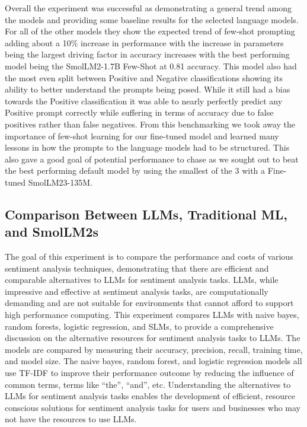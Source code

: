\documentclass[10pt,twocolumn,letterpaper]{article}
\begin{document}
Overall the experiment was successful as demonstrating a general trend among the models and providing some baseline results for the selected language models. For all of the other models they show the expected trend of few-shot prompting adding about a 10\% increase in performance with the increase in parameters being the largest driving factor in accuracy increases with the best performing model being the SmolLM2-1.7B Few-Shot at 0.81 accuracy. This model also had the most even split between Positive and Negative classifications showing its ability to better understand the prompts being posed. While it still had a bias towards the Positive classification it was able to nearly perfectly predict any Positive prompt correctly while suffering in terms of accuracy due to false positives rather than false negatives. From this benchmarking we took away the importance of few-shot learning for our fine-tuned model and learned many lessons in how the prompts to the language models had to be structured. This also gave a good goal of potential performance to chase as we sought out to beat the best performing default model by using the smallest of the 3 with a Fine-tuned SmolLM23-135M. 


\subsection{Comparison Between LLMs, Traditional ML, and SmolLM2s}
The goal of this experiment is to compare the performance and costs of various sentiment analysis techniques, demonstrating that there are efficient and comparable alternatives to LLMs for sentiment analysis tasks. LLMs, while impressive and effective at sentiment analysis tasks, are computationally demanding and are not suitable for environments that cannot afford to support high performance computing. This experiment compares LLMs with naive bayes, random forests, logistic regression, and SLMs, to provide a comprehensive discussion on the alternative resources for sentiment analysis tasks to LLMs. The models are compared by measuring their accuracy, precision, recall, training time, and model size. The naive bayes, random forest, and logistic regression models all use TF-IDF to improve their performance outcome by reducing the influence of common terms, terms like “the”, “and”, etc. Understanding the alternatives to LLMs for sentiment analysis tasks enables the development of efficient, resource conscious solutions for sentiment analysis tasks for users and businesses who may not have the resources to use LLMs.
\end{document}
